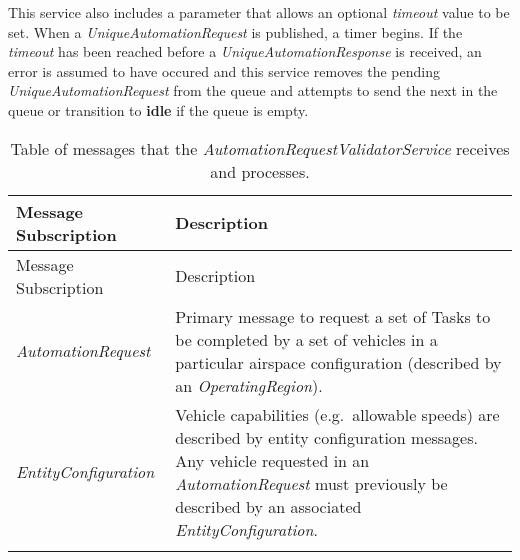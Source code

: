 This service also includes a parameter that allows an optional
\emph{timeout} value to be set. When a \emph{UniqueAutomationRequest} is
published, a timer begins. If the \emph{timeout} has been reached before
a \emph{UniqueAutomationResponse} is received, an error is assumed to
have occured and this service removes the pending
\emph{UniqueAutomationRequest} from the queue and attempts to send the
next in the queue or transition to \textbf{idle} if the queue is empty.

\begin{longtable}[c]{@{}ll@{}}
\caption{Table of messages that the
\emph{AutomationRequestValidatorService} receives and
processes.}\tabularnewline
\toprule
\begin{minipage}[b]{0.29\columnwidth}\raggedright\strut
Message Subscription
\strut\end{minipage} &
\begin{minipage}[b]{0.65\columnwidth}\raggedright\strut
Description
\strut\end{minipage}\tabularnewline
\midrule
\endfirsthead
\toprule
\begin{minipage}[b]{0.29\columnwidth}\raggedright\strut
Message Subscription
\strut\end{minipage} &
\begin{minipage}[b]{0.65\columnwidth}\raggedright\strut
Description
\strut\end{minipage}\tabularnewline
\midrule
\endhead
\begin{minipage}[t]{0.29\columnwidth}\raggedright\strut
\emph{AutomationRequest}
\strut\end{minipage} &
\begin{minipage}[t]{0.65\columnwidth}\raggedright\strut
Primary message to request a set of Tasks to be completed by a set of
vehicles in a particular airspace configuration (described by an
\emph{OperatingRegion}).
\strut\end{minipage}\tabularnewline
\begin{minipage}[t]{0.29\columnwidth}\raggedright\strut
\emph{EntityConfiguration}
\strut\end{minipage} &
\begin{minipage}[t]{0.65\columnwidth}\raggedright\strut
Vehicle capabilities (e.g.~allowable speeds) are described by entity
configuration messages. Any vehicle requested in an
\emph{AutomationRequest} must previously be described by an associated
\emph{EntityConfiguration}.
\strut\end{minipage}\tabularnewline
\begin{minipage}[t]{0.29\columnwidth}\raggedright\strut

\end{minipage}
\end{longtable}

